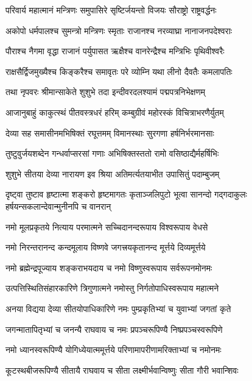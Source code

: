 \twolineshloka
{परिवार्य महात्मानं मन्त्रिणः समुपासिरे}
{सृष्टिर्जयन्तो विजयः सौराष्ट्रो राष्ट्रवर्द्धनः}%

\twolineshloka
{अकोपो धर्मपालश्च सुमन्त्रो मन्त्रिणः स्मृताः}
{राजानश्च नरव्याघ्रा नानाजनपदेश्वराः}%

\twolineshloka
{पौराश्च नैगमा वृद्धा राजानं पर्युपासत}
{ऋक्षैश्च वानरेन्द्रैश्च मन्त्रिभिः पृथिवीश्वरैः}%

\twolineshloka
{राक्षसैर्द्विजमुख्यैश्च किङ्करैश्च समावृतः}
{परे व्योम्नि यथा लीनो दैवतैः कमलापतिः}%

\twolineshloka
{तथा नृपवरः श्रीमान्साकेते शुशुभे तदा}
{इन्दीवरदलश्यामं पद्मपत्रनिभेक्षणम्}%

\twolineshloka
{आजानुबाहुं काकुत्स्थं पीतवस्त्रधरं हरिम्}
{कम्बुग्रीवं महोरस्कं विचित्राभरणैर्युतम्}%

\twolineshloka
{देव्या सह समासीनमभिषिक्तं रघूत्तमम्}
{विमानस्थाः सुरगणा हर्षनिर्भरमानसाः}%

\twolineshloka
{तुष्टुवुर्जयशब्देन गन्धर्वाप्सरसां गणाः}
{अभिषिक्तस्ततो रामो वसिष्ठाद्यैर्महर्षिभिः}%

\twolineshloka
{शुशुभे सीतया देव्या नारायण इव श्रिया}
{अतिमर्त्यतयाभीत उपासितुं पदाम्बुजम्}%

\threelineshloka
{दृष्ट्वा तुष्टाव हृष्टात्मा शङ्करो हृष्टमागतः}
{कृताञ्जलिपुटो भूत्वा सानन्दो गद्गदाकुलः}
{हर्षयन्सकलान्देवान्मुनीनपि च वानरान्}%


\twolineshloka
{नमो मूलप्रकृतये नित्याय परमात्मने}
{सच्चिदानन्दरूपाय विश्वरूपाय वेधसे}%

\twolineshloka
{नमो निरन्तरानन्द कन्दमूलाय विष्णवे}
{जगत्त्रयकृतानन्द मूर्त्तये दिव्यमूर्त्तये}%

\twolineshloka
{नमो ब्रह्मेन्द्रपूज्याय शङ्कराभयदाय च}
{नमो विष्णुस्वरूपाय सर्वरूपनमोनमः}%

\twolineshloka
{उत्पत्तिस्थितिसंहारकारिणे त्रिगुणात्मने}
{नमोस्तु निर्गतोपाधिस्वरूपाय महात्मने}%

\twolineshloka
{अनया विद्यया देव्या सीतयोपाधिकारिणे}
{नमः पुम्प्रकृतिभ्यां च युवाभ्यां जगतां कृते}%

\twolineshloka
{जगन्मातापितृभ्यां च जनन्यै राघवाय च}
{नमः प्रपञ्चरूपिण्यै निष्प्रपञ्चस्वरूपिणे}%

\twolineshloka
{नमो ध्यानस्वरूपिण्यै योगिध्येयात्ममूर्त्तये}
{परिणामापरीणामरिक्ताभ्यां च नमोनमः}%

\twolineshloka
{कूटस्थबीजरूपिण्यै सीतायै राघवाय च}
{सीता लक्ष्मीर्भवान्विष्णुः सीता गौरी भवान्शिवः}%

